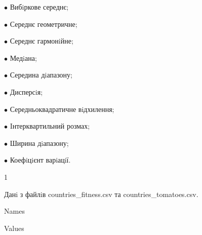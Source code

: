 \documentclass[a4paper,portrait,12pt]{article}
\begin{document}
\begin{flushleft}
$\bullet$ Вибiркове середнє;
\end{flushleft}


\begin{flushleft}
$\bullet$ Середнє геометричне;
\end{flushleft}


\begin{flushleft}
$\bullet$ Середнє гармонiйне;
\end{flushleft}


\begin{flushleft}
$\bullet$ Медiана;
\end{flushleft}


\begin{flushleft}
$\bullet$ Середина дiапазону;
\end{flushleft}


\begin{flushleft}
$\bullet$ Дисперсiя;
\end{flushleft}


\begin{flushleft}
$\bullet$ Середньоквадратичне вiдхилення;
\end{flushleft}


\begin{flushleft}
$\bullet$ Iнтерквартильний розмах;
\end{flushleft}


\begin{flushleft}
$\bullet$ Ширина дiапазону;
\end{flushleft}


\begin{flushleft}
$\bullet$ Коефiцiєнт варiацiї.
\end{flushleft}





1





\begin{flushleft}
\newpage
Данi з файлiв countries\_fitness.csv та countries\_tomatoes.csv.
\end{flushleft}


\begin{flushleft}
Names
\end{flushleft}


\begin{flushleft}
Values
\end{flushleft}
\end{document}
